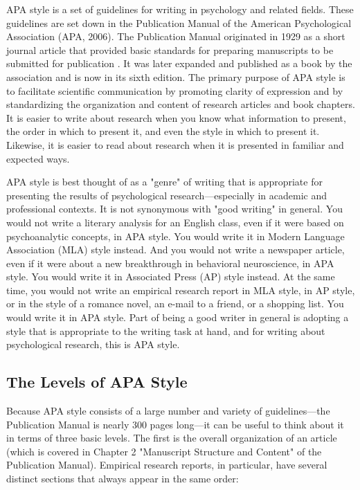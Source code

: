 APA style is a set of guidelines for writing in psychology and related fields. These guidelines are set down in the Publication Manual of the American Psychological Association (APA, 2006). The Publication Manual originated in 1929 as a short journal article that provided basic standards for preparing manuscripts to be submitted for publication \citep{bentley_instructions_1929}. It was later expanded and published as a book by the association and is now in its sixth edition. The primary purpose of APA style is to facilitate scientific communication by promoting clarity of expression and by standardizing the organization and content of research articles and book chapters. It is easier to write about research when you know what information to present, the order in which to present it, and even the style in which to present it. Likewise, it is easier to read about research when it is presented in familiar and expected ways.

APA style is best thought of as a "genre" of writing that is appropriate for presenting the results of psychological research---especially in academic and professional contexts. It is not synonymous with "good writing" in general. You would not write a literary analysis for an English class, even if it were based on psychoanalytic concepts, in APA style. You would write it in Modern Language Association (MLA) style instead. And you would not write a newspaper article, even if it were about a new breakthrough in behavioral neuroscience, in APA style. You would write it in Associated Press (AP) style instead. At the same time, you would not write an empirical research report in MLA style, in AP style, or in the style of a romance novel, an e-mail to a friend, or a shopping list. You would write it in APA style. Part of being a good writer in general is adopting a style that is appropriate to the writing task at hand, and for writing about psychological research, this is APA style.

\subsection{The Levels of APA Style}

Because APA style consists of a large number and variety of guidelines---the Publication Manual is nearly 300 pages long---it can be useful to think about it in terms of three basic levels. The first is the overall organization of an article (which is covered in Chapter 2 "Manuscript Structure and Content" of the Publication Manual). Empirical research reports, in particular, have several distinct sections that always appear in the same order:


